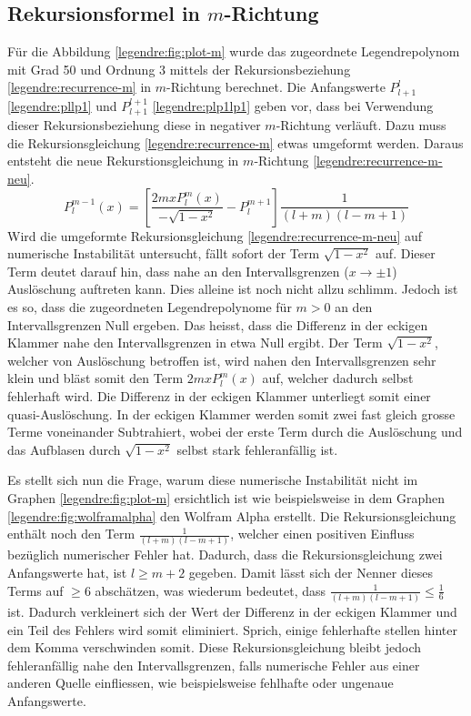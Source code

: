\subsection{Rekursionsformel in $m$-Richtung
\label{legendre:subsection:mrichtung}}
Für die Abbildung \ref{legendre:fig:plot-m} wurde das zugeordnete Legendrepolynom mit Grad 50 und Ordnung 3 mittels der Rekursionsbeziehung \eqref{legendre:recurrence-m} in $m$-Richtung berechnet.
Die Anfangswerte $P^{l}_{l+1}$ \eqref{legendre:pllp1} und $P^{l+1}_{l+1}$ \eqref{legendre:plp1lp1} geben vor, dass bei Verwendung dieser Rekursionsbeziehung diese in negativer $m$-Richtung verläuft.
Dazu muss die Rekursionsgleichung \eqref{legendre:recurrence-m} etwas umgeformt werden.
Daraus entsteht die neue Rekurstionsgleichung in $m$-Richtung \eqref{legendre:recurrence-m-neu}.
\begin{equation}
P^{m-1}_{l}(x)
= \left[ \frac{2mxP^{m}_{l}(x)}{- \sqrt{1-x^2}}-P^{m+1}_{l} \right]
\frac{1}{(l+m)(l-m+1)}
\label{legendre:recurrence-m-neu}
\end{equation}
Wird die umgeformte Rekursionsgleichung \eqref{legendre:recurrence-m-neu} auf numerische Instabilität untersucht, fällt sofort der Term $\sqrt{1-x^2}$ auf.
Dieser Term deutet darauf hin, dass nahe an den Intervallsgrenzen ($x \rightarrow \pm 1$) Auslöschung auftreten kann.
Dies alleine ist noch nicht allzu schlimm.
Jedoch ist es so, dass die zugeordneten Legendrepolynome für $m>0$ an den Intervallsgrenzen Null ergeben.
Das heisst, dass die Differenz in der eckigen Klammer nahe den Intervallsgrenzen in etwa Null ergibt.
Der Term $\sqrt{1-x^2}$, welcher von Auslöschung betroffen ist, wird nahen den Intervallsgrenzen sehr klein und bläst somit den Term $2mxP^{m}_{l}(x)$ auf, welcher dadurch selbst fehlerhaft wird.
Die Differenz in der eckigen Klammer unterliegt somit einer quasi-Auslöschung.
In der eckigen Klammer werden somit zwei fast gleich grosse Terme voneinander Subtrahiert, wobei der erste Term durch die Auslöschung und das Aufblasen durch $\sqrt{1-x^2}$ selbst stark fehleranfällig ist.

Es stellt sich nun die Frage, warum diese numerische Instabilität nicht im Graphen \ref{legendre:fig:plot-m} ersichtlich ist wie beispielsweise in dem Graphen \ref{legendre:fig:wolframalpha} den Wolfram Alpha erstellt.
Die Rekursionsgleichung enthält noch den Term $\frac{1}{(l+m)(l-m+1)}$, welcher einen positiven Einfluss bezüglich numerischer Fehler hat.
Dadurch, dass die Rekursionsgleichung zwei Anfangswerte hat, ist $l\geq m+2$ gegeben.
Damit lässt sich der Nenner dieses Terms auf $\geq 6$ abschätzen, was wiederum bedeutet, dass $\frac{1}{(l+m)(l-m+1)} \leq \frac{1}{6}$ ist.
Dadurch verkleinert sich der Wert der Differenz in der eckigen Klammer und ein Teil des Fehlers wird somit eliminiert.
Sprich, einige fehlerhafte stellen hinter dem Komma verschwinden somit.
Diese Rekursionsgleichung bleibt jedoch fehleranfällig nahe den Intervallsgrenzen, falls numerische Fehler aus einer anderen Quelle einfliessen, wie beispielsweise fehlhafte oder ungenaue Anfangswerte.

